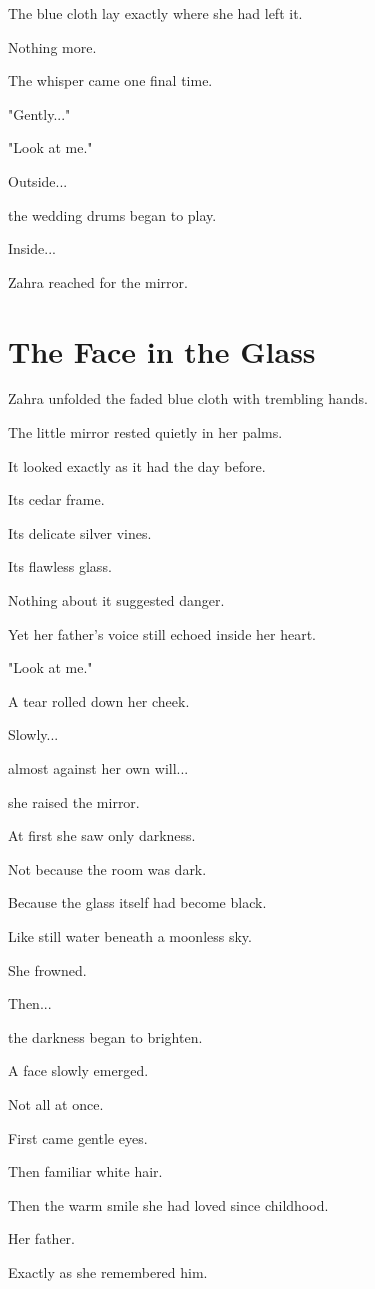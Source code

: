 \documentclass[12pt,openany]{book}
\begin{document}
The blue cloth lay exactly where she had left it.

Nothing more.

The whisper came one final time.

"Gently..."

"Look at me."

Outside...

the wedding drums began to play.

Inside...

Zahra reached for the mirror.
\section*{The Face in the Glass}

Zahra unfolded the faded blue cloth with trembling hands.

The little mirror rested quietly in her palms.

It looked exactly as it had the day before.

Its cedar frame.

Its delicate silver vines.

Its flawless glass.

Nothing about it suggested danger.

Yet her father's voice still echoed inside her heart.

"Look at me."

A tear rolled down her cheek.

Slowly...

almost against her own will...

she raised the mirror.

At first she saw only darkness.

Not because the room was dark.

Because the glass itself had become black.

Like still water beneath a moonless sky.

She frowned.

Then...

the darkness began to brighten.

A face slowly emerged.

Not all at once.

First came gentle eyes.

Then familiar white hair.

Then the warm smile she had loved since childhood.

Her father.

Exactly as she remembered him.
\end{document}
